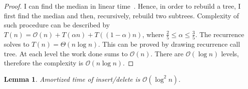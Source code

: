 \documentclass[10pt,a4paper]{article}
\newtheorem{lemma}{Lemma}
\newcommand{\Oh}{\mathcal{O}}
\begin{document}
\begin{proof}
I can find the median in linear time~\cite{FIVE}. Hence, in order to rebuild a tree, I first find the median and then, recursively, rebuild two subtrees. Complexity of such procedure can be described by $T(n)=\Oh(n)+T(\alpha n)+T((1-\alpha)n)$, where $\frac{2}{5}\leq \alpha \leq \frac{3}{5}$. The recurrence solves to $T(n)=\Theta(n\log n)$. This can be proved by drawing recurrence call tree. At each level the work done sums to $\Oh(n)$. There are $\Oh(\log n)$ levels, therefore the complexity is $\Oh(n \log n)$.
\end{proof}

\begin{lemma}\label{lem:2}
Amortized time of insert/delete is $\Oh(\log^2 n)$.
\end{lemma}
\end{document}
